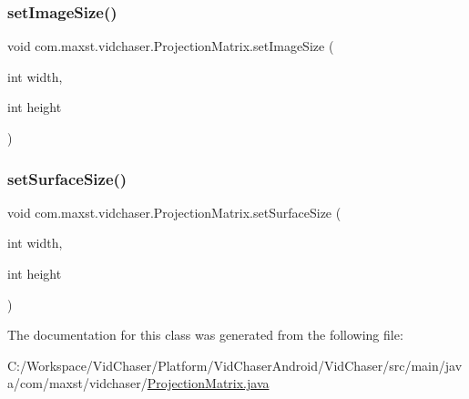 \subsubsection{\texorpdfstring{set\+Image\+Size()}{setImageSize()}}
{\footnotesize\ttfamily void com.\+maxst.\+vidchaser.\+Projection\+Matrix.\+set\+Image\+Size (\begin{DoxyParamCaption}\item[{int}]{width,  }\item[{int}]{height }\end{DoxyParamCaption})}

\mbox{\label{classcom_1_1maxst_1_1vidchaser_1_1_projection_matrix_a64bdf3583a8aede82bb6fc6721346134}} 
\subsubsection{\texorpdfstring{set\+Surface\+Size()}{setSurfaceSize()}}
{\footnotesize\ttfamily void com.\+maxst.\+vidchaser.\+Projection\+Matrix.\+set\+Surface\+Size (\begin{DoxyParamCaption}\item[{int}]{width,  }\item[{int}]{height }\end{DoxyParamCaption})}



The documentation for this class was generated from the following file\+:\begin{DoxyCompactItemize}
\item 
C\+:/\+Workspace/\+Vid\+Chaser/\+Platform/\+Vid\+Chaser\+Android/\+Vid\+Chaser/src/main/java/com/maxst/vidchaser/\hyperlink{_projection_matrix_8java}{Projection\+Matrix.\+java}\end{DoxyCompactItemize}
